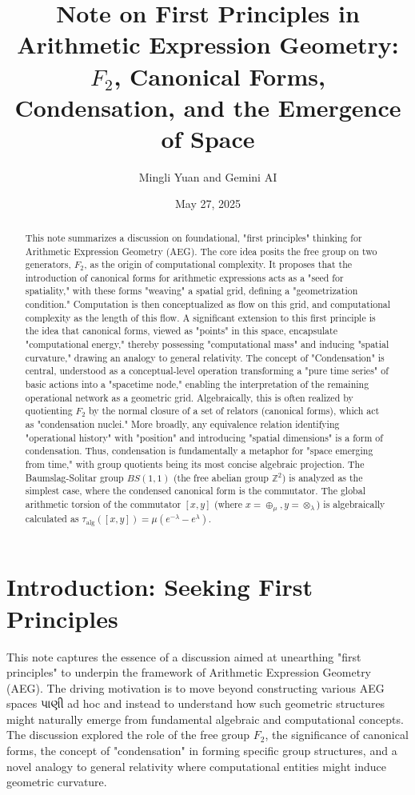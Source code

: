 \documentclass[12pt, a4paper]{article}
\title{Note on First Principles in Arithmetic Expression Geometry: $F_2$, Canonical Forms, Condensation, and the Emergence of Space}
\author{Mingli Yuan and Gemini AI}
\date{May 27, 2025} %
\theoremstyle{definition}
\begin{document}
\maketitle
\begin{abstract}
This note summarizes a discussion on foundational, "first principles" thinking for Arithmetic Expression Geometry (AEG). The core idea posits the free group on two generators, $F_2$, as the origin of computational complexity. It proposes that the introduction of canonical forms for arithmetic expressions acts as a "seed for spatiality," with these forms "weaving" a spatial grid, defining a "geometrization condition." Computation is then conceptualized as flow on this grid, and computational complexity as the length of this flow. A significant extension to this first principle is the idea that canonical forms, viewed as "points" in this space, encapsulate "computational energy," thereby possessing "computational mass" and inducing "spatial curvature," drawing an analogy to general relativity. The concept of "Condensation" is central, understood as a conceptual-level operation transforming a "pure time series" of basic actions into a "spacetime node," enabling the interpretation of the remaining operational network as a geometric grid. Algebraically, this is often realized by quotienting $F_2$ by the normal closure of a set of relators (canonical forms), which act as "condensation nuclei." More broadly, any equivalence relation identifying "operational history" with "position" and introducing "spatial dimensions" is a form of condensation. Thus, condensation is fundamentally a metaphor for "space emerging from time," with group quotients being its most concise algebraic projection. The Baumslag-Solitar group $BS(1,1)$ (the free abelian group $\mathbb{Z}^2$) is analyzed as the simplest case, where the condensed canonical form is the commutator. The global arithmetic torsion of the commutator $[x,y]$ (where $x = \oplus_\mu, y = \otimes_\lambda$) is algebraically calculated as $\tau_{\text{alg}}([x,y]) = \mu(e^{-\lambda} - e^\lambda)$.
\end{abstract}

\tableofcontents
\newpage

\section{Introduction: Seeking First Principles}

This note captures the essence of a discussion aimed at unearthing "first principles" to underpin the framework of Arithmetic Expression Geometry (AEG). The driving motivation is to move beyond constructing various AEG spaces પાણી ad hoc and instead to understand how such geometric structures might naturally emerge from fundamental algebraic and computational concepts. The discussion explored the role of the free group $F_2$, the significance of canonical forms, the concept of "condensation" in forming specific group structures, and a novel analogy to general relativity where computational entities might induce geometric curvature.
\end{document}
